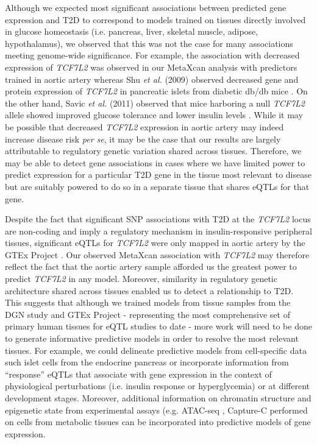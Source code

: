 \documentclass[10pt]{article}
\begin{document}
Although we expected most significant associations between predicted gene expression and T2D to correspond to models trained on tissues directly involved in glucose homeostasis (i.e. pancreas, liver, skeletal muscle, adipose, hypothalamus), we observed that this was not the case for many associations meeting genome-wide significance.  For example, the association with decreased expression of \textit{TCF7L2} was observed in our MetaXcan analysis with predictors trained in aortic artery whereas Shu \textit{et al.} (2009) observed decreased gene and protein expression of \textit{TCF7L2} in pancreatic islets from diabetic db/db mice \cite{Shu2009}. On the other hand, Savic \textit{et al.} (2011) observed that mice harboring a null \textit{TCF7L2} allele showed improved glucose tolerance and lower insulin levels \cite{Savic2011}. While it may be possible that decreased \textit{TCF7L2} expression in aortic artery may indeed increase disease risk \textit{per se}, it may be the case that our results are largely attributable to regulatory genetic variation shared across tissues. Therefore, we may be able to detect gene associations in cases where we have limited power to predict expression for a particular T2D gene in the tissue most relevant to disease but are suitably powered to do so in a separate tissue that shares eQTLs for that gene. 

Despite the fact that significant SNP associations with T2D at the \textit{TCF7L2} locus are non-coding and imply a regulatory mechanism in insulin-responsive peripheral tissues, significant eQTLs for \textit{TCF7L2} were only mapped in aortic artery by the GTEx Project \cite{TheGTExConsortium2015}. Our observed MetaXcan association with \textit{TCF7L2} may therefore reflect the fact that the aortic artery sample afforded us the greatest power to predict \textit{TCF7L2} in any model. Moreover, similarity in regulatory genetic architecture shared across tissues enabled us to detect a relationship to T2D. This suggests that although we trained models from tissue samples from the DGN study and GTEx Project - representing the most comprehensive set of primary human tissues for eQTL studies to date - more work will need to be done to generate informative predictive models in order to resolve the most relevant tissues. For example, we could delineate predictive models from cell-specific data such islet cells from the endocrine pancreas or incorporate information from ``response'' eQTLs that associate with gene expression in the context of physiological perturbations (i.e. insulin response or hyperglycemia) or at different development stages. Moreover, additional information on chromatin structure and epigenetic state from experimental assays (e.g. ATAC-seq \cite{Buenrostro2013}, Capture-C \cite{Hughes2014} performed on cells from metabolic tissues can be incorporated into predictive models of gene expression. 
\end{document}
